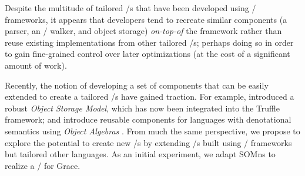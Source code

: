 Despite the multitude of tailored \VM/s that have been developed using \VM/ frameworks, it appears that developers tend to recreate similar components (a parser, an \AST/ walker, and object storage) \emph{on-top-of} the framework rather than reuse existing implementations from other tailored \VM/s; perhaps doing so in order to gain fine-grained control over later optimizations (at the cost of a significant amount of work).

Recently, the notion of developing a set of components that can be easily extended to create a tailored \VM/s have gained traction. For example,  introduced a robust \emph{Object Storage Model}, which has now been integrated into the Truffle framework; and  introduce reusable components for languages with denotational semantics using \emph{Object Algebras} . From much the same perspective, we propose to explore the potential to create new \VM/s by extending \VM/s built using \VM/ frameworks but tailored other languages. As an initial experiment, we adapt SOMns to realize a \VM/ for Grace.


%




%





